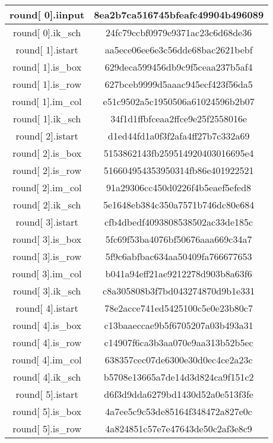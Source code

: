 \begin{center}
\begin{longtable}{|c|c|}
\hline
round[ 0].iinput&   8ea2b7ca516745bfeafc49904b496089\\
\hline
round[ 0].ik\_sch&   24fc79ccbf0979e9371ac23c6d68de36\\
\hline
round[ 1].istart&   aa5ece06ee6e3c56dde68bac2621bebf\\
\hline
round[ 1].is\_box&   629deca599456db9c9f5ceaa237b5af4\\
\hline
round[ 1].is\_row&   627bceb9999d5aaac945ecf423f56da5\\
\hline
round[ 1].im\_col&   e51c9502a5c1950506a61024596b2b07\\
\hline
round[ 1].ik\_sch&   34f1d1ffbfceaa2ffce9e25f2558016e\\
\hline
round[ 2].istart&   d1ed44fd1a0f3f2afa4ff27b7c332a69\\
\hline
round[ 2].is\_box&   5153862143fb259514920403016695e4\\
\hline
round[ 2].is\_row&   516604954353950314fb86e401922521\\
\hline
round[ 2].im\_col&   91a29306cc450d0226f4b5eaef5efed8\\
\hline
round[ 2].ik\_sch&   5e1648eb384c350a7571b746dc80e684\\
\hline
round[ 3].istart&   cfb4dbedf4093808538502ac33de185c\\
\hline
round[ 3].is\_box&   5fc69f53ba4076bf50676aaa669c34a7\\
\hline
round[ 3].is\_row&   5f9c6abfbac634aa50409fa766677653\\
\hline
round[ 3].im\_col&   b041a94eff21ae9212278d903b8a63f6\\
\hline
round[ 3].ik\_sch&   c8a305808b3f7bd043274870d9b1e331\\
\hline
round[ 4].istart&   78e2acce741ed5425100c5e0e23b80c7\\
\hline
round[ 4].is\_box&   c13baaeccae9b5f6705207a03b493a31\\
\hline
round[ 4].is\_row&   c14907f6ca3b3aa070e9aa313b52b5ec\\
\hline
round[ 4].im\_col&   638357cec07de6300e30d0ec4ce2a23c\\
\hline
round[ 4].ik\_sch&   b5708e13665a7de14d3d824ca9f151c2\\
\hline
round[ 5].istart&   d6f3d9dda6279bd1430d52a0e513f3fe\\
\hline
round[ 5].is\_box&   4a7ee5c9c53de85164f348472a827e0c\\
\hline
round[ 5].is\_row&   4a824851c57e7e47643de50c2af3e8c9\\

\end{longtable}
\end{center}
